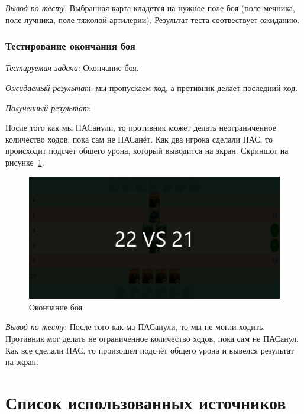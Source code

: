 \documentclass[12pt, a4paper, simple]{eskdtext}
\begin{document}
    \textit{Вывод по тесту}: Выбранная карта кладется на нужное поле боя (поле мечника, поле лучника, поле тяжолой артилерии).
    Результат теста соотвествует ожиданию.


    \newpage
    \subsubsection*{Тестирование окончания боя}

    \textit{Тестируемая задача}: \underline{Окончание боя}.
    
    \textit{Ожидаемый результат}: мы пропускаем ход, а противник делает последний ход.
    
    \textit{Полученный результат}:

    После того как мы ПАСанули, то противник может делать неограниченное количество ходов, пока сам не ПАСанёт.
    Как два игрока сделали ПАС, то происходит подсчёт общего урона, который выводится на экран.
    Скриншот на рисунке~\ref{fig:test_finish_game}.

    \begin{figure}[!h]
        \centering
        \includegraphics[width=12cm]
            {_assets/finish_game.png}
        \caption{Окончание боя}
        \label{fig:test_finish_game}
    \end{figure}

    \textit{Вывод по тесту}: После того как ма ПАСанули, то мы не могли ходить.
    Противник мог делать не ограниченное количество ходов,
    пока сам не ПАСанул.
    Как все сделали ПАС, то произошел подсчёт общего урона и вывелся результат на экран.

    \newpage

    \newpage
    \begingroup
      \section*{Список использованных источников}
    
\end{document}
